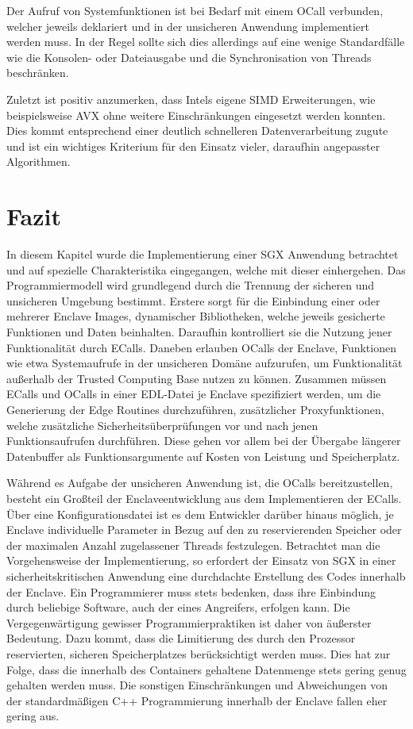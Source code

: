 Der Aufruf von Systemfunktionen ist bei Bedarf mit einem \ac{OCall} verbunden, welcher jeweils deklariert und in der unsicheren Anwendung implementiert werden muss. In der Regel sollte sich dies allerdings auf eine wenige Standardfälle wie die Konsolen- oder Dateiausgabe und die Synchronisation von Threads beschränken.

Zuletzt ist positiv anzumerken, dass Intels eigene \ac{SIMD} Erweiterungen, wie beispielsweise \ac{AVX} ohne weitere Einschränkungen eingesetzt werden konnten. Dies kommt entsprechend einer deutlich schnelleren Datenverarbeitung zugute und ist ein wichtiges Kriterium für den Einsatz vieler, daraufhin angepasster Algorithmen.

\section{Fazit}

In diesem Kapitel wurde die Implementierung einer \ac{SGX} Anwendung betrachtet und auf spezielle Charakteristika eingegangen, welche mit dieser einhergehen. Das Programmiermodell wird grundlegend durch die Trennung der sicheren und unsicheren Umgebung bestimmt. Erstere sorgt für die Einbindung einer oder mehrerer Enclave Images, dynamischer Bibliotheken, welche jeweils gesicherte Funktionen und Daten beinhalten. Daraufhin kontrolliert sie die Nutzung jener Funktionalität durch \acp{ECall}. Daneben erlauben \acp{OCall} der Enclave, Funktionen wie etwa Systemaufrufe in der unsicheren Domäne aufzurufen, um Funktionalität außerhalb der Trusted Computing Base nutzen zu können. Zusammen müssen \acp{ECall} und \acp{OCall} in einer \ac{EDL}-Datei  je Enclave spezifiziert werden, um die Generierung der Edge Routines durchzuführen, zusätzlicher Proxyfunktionen, welche zusätzliche Sicherheitsüberprüfungen vor und nach jenen Funktionsaufrufen durchführen. Diese gehen vor allem bei der Übergabe längerer Datenbuffer als Funktionsargumente auf Kosten von Leistung und Speicherplatz.

Während es Aufgabe der unsicheren Anwendung ist, die \acp{OCall} bereitzustellen, besteht ein Großteil der Enclaveentwicklung aus dem Implementieren der \acp{ECall}. Über eine Konfigurationsdatei ist es dem Entwickler darüber hinaus möglich, je Enclave individuelle Parameter in Bezug auf den zu reservierenden Speicher oder der maximalen Anzahl zugelassener Threads festzulegen. Betrachtet man die Vorgehensweise der Implementierung, so erfordert der Einsatz von \ac{SGX} in einer sicherheitskritischen Anwendung eine durchdachte Erstellung des Codes innerhalb der Enclave. Ein Programmierer muss stets bedenken, dass ihre Einbindung durch beliebige Software, auch der eines Angreifers, erfolgen kann. Die Vergegenwärtigung gewisser Programmierpraktiken ist daher von äußerster Bedeutung. Dazu kommt, dass die Limitierung des durch den Prozessor reservierten, sicheren Speicherplatzes berücksichtigt werden muss. Dies hat zur Folge, dass die innerhalb des Containers gehaltene Datenmenge stets gering genug gehalten werden muss. Die sonstigen Einschränkungen und Abweichungen von der standardmäßigen C++ Programmierung innerhalb der Enclave fallen eher gering aus.